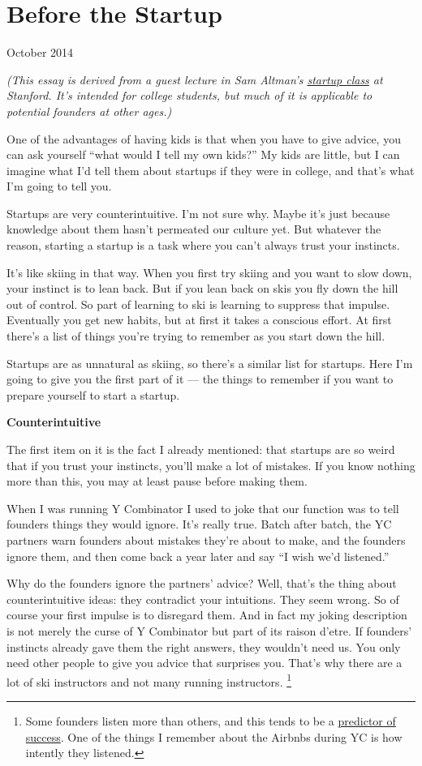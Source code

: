\chapter{Before the Startup}

October 2014

\emph{(This essay is derived from a guest lecture in Sam Altman's
\href{http://startupclass.samaltman.com/}{startup class} at Stanford.
It's intended for college students, but much of it is applicable to
potential founders at other ages.)}

One of the advantages of having kids is that when you have to give
advice, you can ask yourself ``what would I tell my own kids?'' My kids
are little, but I can imagine what I'd tell them about startups if they
were in college, and that's what I'm going to tell you.

Startups are very counterintuitive. I'm not sure why. Maybe it's just
because knowledge about them hasn't permeated our culture yet. But
whatever the reason, starting a startup is a task where you can't always
trust your instincts.

It's like skiing in that way. When you first try skiing and you want to
slow down, your instinct is to lean back. But if you lean back on skis
you fly down the hill out of control. So part of learning to ski is
learning to suppress that impulse. Eventually you get new habits, but at
first it takes a conscious effort. At first there's a list of things
you're trying to remember as you start down the hill.

Startups are as unnatural as skiing, so there's a similar list for
startups. Here I'm going to give you the first part of it --- the things
to remember if you want to prepare yourself to start a startup.

\textbf{Counterintuitive}

The first item on it is the fact I already mentioned: that startups are
so weird that if you trust your instincts, you'll make a lot of
mistakes. If you know nothing more than this, you may at least pause
before making them.

When I was running Y Combinator I used to joke that our function was to
tell founders things they would ignore. It's really true. Batch after
batch, the YC partners warn founders about mistakes they're about to
make, and the founders ignore them, and then come back a year later and
say ``I wish we'd listened.''

Why do the founders ignore the partners' advice? Well, that's the thing
about counterintuitive ideas: they contradict your intuitions. They seem
wrong. So of course your first impulse is to disregard them. And in fact
my joking description is not merely the curse of Y Combinator but part
of its raison d'etre. If founders' instincts already gave them the right
answers, they wouldn't need us. You only need other people to give you
advice that surprises you. That's why there are a lot of ski instructors
and not many running instructors. \footnote{Some founders listen more than others, and this tends to be a
\href{word.html}{predictor of success}. One of the things I remember
about the Airbnbs during YC is how intently they listened.}

